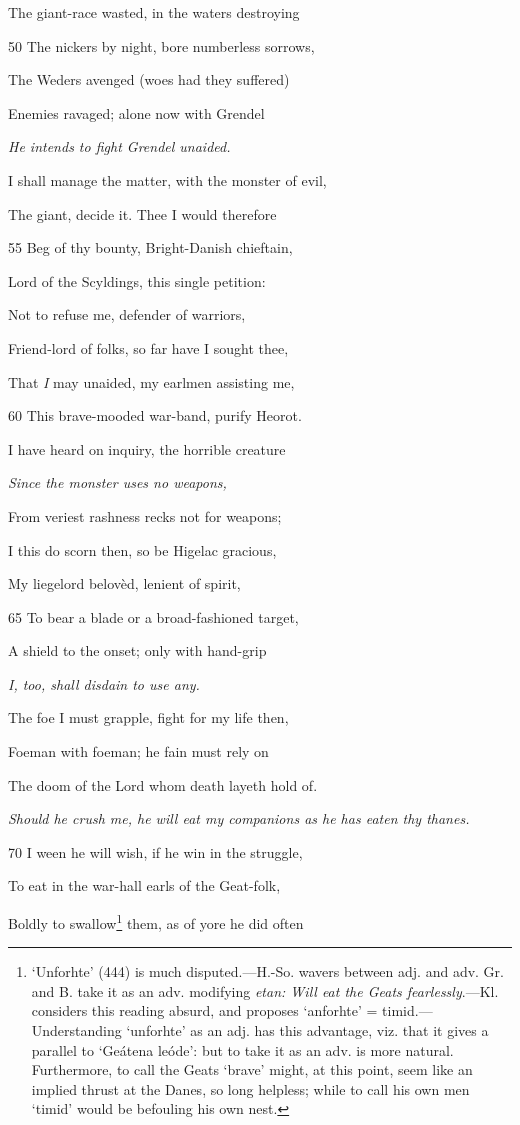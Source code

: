 The giant-race wasted, in the waters destroying

50
The nickers by night, bore numberless sorrows,

The Weders avenged (woes had they suffered)

Enemies ravaged; alone now with Grendel

\emph{He intends to fight
Grendel unaided.}

I shall manage the matter, with the monster of evil,

The giant, decide it. Thee I would therefore

55
Beg of thy bounty, Bright-Danish chieftain,

Lord of the Scyldings, this single petition:

Not to refuse me, defender of warriors,

Friend-lord of folks, so far have I sought thee,

That \emph{I} may unaided, my earlmen assisting me,

60
This brave-mooded war-band, purify Heorot.

I have heard on inquiry, the horrible creature

\emph{Since the monster
uses no weapons,}

From veriest rashness recks not for weapons;

I this do scorn then, so be Higelac gracious,

My liegelord belovèd, lenient of spirit,

65
To bear a blade or a broad-fashioned target,

A shield to the onset; only with hand-grip

\emph{I, too, shall disdain
to use any.}

The foe I must grapple, fight for my life then,

Foeman with foeman; he fain must rely on

The doom of the Lord whom death layeth hold of.

\emph{Should he crush
me, he will eat my
companions as he
has eaten thy
thanes.}

70
I ween he will wish, if he win in the struggle,

To eat in the war-hall earls of the Geat-folk,

Boldly to swallow\footnote{‘Unforhte’ (444) is much disputed.—H.-So. wavers between adj. and adv.
Gr. and B. take it as an adv. modifying \emph{etan: Will eat the Geats fearlessly}.—Kl.
considers this reading absurd, and proposes ‘anforhte’ = timid.—Understanding
‘unforhte’ as an adj. has this advantage, viz. that it gives a parallel
to ‘Geátena leóde’: but to take it as an adv. is more natural. Furthermore, to
call the Geats ‘brave’ might, at this point, seem like an implied thrust at the
Danes, so long helpless; while to call his own men ‘timid’ would be befouling
his own nest.} them, as of yore he did often

